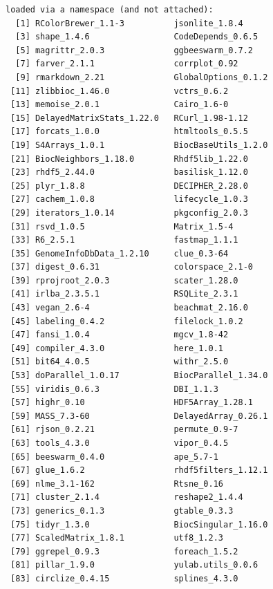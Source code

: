 \documentclass[
]{book}
\begin{document}
\begin{verbatim}
loaded via a namespace (and not attached):
  [1] RColorBrewer_1.1-3          jsonlite_1.8.4             
  [3] shape_1.4.6                 CodeDepends_0.6.5          
  [5] magrittr_2.0.3              ggbeeswarm_0.7.2           
  [7] farver_2.1.1                corrplot_0.92              
  [9] rmarkdown_2.21              GlobalOptions_0.1.2        
 [11] zlibbioc_1.46.0             vctrs_0.6.2                
 [13] memoise_2.0.1               Cairo_1.6-0                
 [15] DelayedMatrixStats_1.22.0   RCurl_1.98-1.12            
 [17] forcats_1.0.0               htmltools_0.5.5            
 [19] S4Arrays_1.0.1              BiocBaseUtils_1.2.0        
 [21] BiocNeighbors_1.18.0        Rhdf5lib_1.22.0            
 [23] rhdf5_2.44.0                basilisk_1.12.0            
 [25] plyr_1.8.8                  DECIPHER_2.28.0            
 [27] cachem_1.0.8                lifecycle_1.0.3            
 [29] iterators_1.0.14            pkgconfig_2.0.3            
 [31] rsvd_1.0.5                  Matrix_1.5-4               
 [33] R6_2.5.1                    fastmap_1.1.1              
 [35] GenomeInfoDbData_1.2.10     clue_0.3-64                
 [37] digest_0.6.31               colorspace_2.1-0           
 [39] rprojroot_2.0.3             scater_1.28.0              
 [41] irlba_2.3.5.1               RSQLite_2.3.1              
 [43] vegan_2.6-4                 beachmat_2.16.0            
 [45] labeling_0.4.2              filelock_1.0.2             
 [47] fansi_1.0.4                 mgcv_1.8-42                
 [49] compiler_4.3.0              here_1.0.1                 
 [51] bit64_4.0.5                 withr_2.5.0                
 [53] doParallel_1.0.17           BiocParallel_1.34.0        
 [55] viridis_0.6.3               DBI_1.1.3                  
 [57] highr_0.10                  HDF5Array_1.28.1           
 [59] MASS_7.3-60                 DelayedArray_0.26.1        
 [61] rjson_0.2.21                permute_0.9-7              
 [63] tools_4.3.0                 vipor_0.4.5                
 [65] beeswarm_0.4.0              ape_5.7-1                  
 [67] glue_1.6.2                  rhdf5filters_1.12.1        
 [69] nlme_3.1-162                Rtsne_0.16                 
 [71] cluster_2.1.4               reshape2_1.4.4             
 [73] generics_0.1.3              gtable_0.3.3               
 [75] tidyr_1.3.0                 BiocSingular_1.16.0        
 [77] ScaledMatrix_1.8.1          utf8_1.2.3                 
 [79] ggrepel_0.9.3               foreach_1.5.2              
 [81] pillar_1.9.0                yulab.utils_0.0.6          
 [83] circlize_0.4.15             splines_4.3.0              

\end{verbatim}
\end{document}
